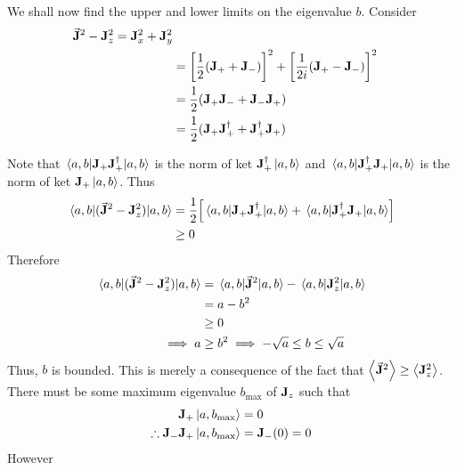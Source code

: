 \documentclass[12pt,a4paper,titlepage]{article}
\newcommand{\trm}[1]{\textrm{#1}} %
\begin{document}
We shall now find the upper and lower limits on the eigenvalue $b$. Consider
\begin{equation}
\begin{aligned}
\vec{\vb{J}}^{2}-\vb{J}_{z}^{2}=\vb{J}_{x}^{2}+\vb{J}_{y}^{2}\\
&=\qty[\frac{1}{2}\qty(\vb{J}_{+}+\vb{J}_{-})]^{2}+\qty[\frac{1}{2i}(\vb{J}_{+}-\vb{J}_{-})]^{2}\\
&=\frac{1}{2}(\vb{J}_{+}\vb{J}_{-}+\vb{J}_{-}\vb{J}_{+})\\
&=\frac{1}{2}(\vb{J}_{+}\vb{J}_{+}^{\dagger}+\vb{J}_{+}^{\dagger}\vb{J}_{+})
\end{aligned}
\end{equation}

Note that $\mel{a,b}{\vb{J}_{+}\vb{J}_{+}^{\dagger}}{a,b}$ is the norm of ket $\vb{J}_{+}^{\dagger}\ket{a,b}$ and $\mel{a,b}{\vb{J}_{+}^{\dagger}\vb{J}_{+}}{a,b}$ is the norm of ket $\vb{J}_{+}\ket{a,b}$. Thus
\begin{equation}
\begin{aligned}
\mel{a,b}{(\vec{\vb{J}}^{2}-\vb{J}_{z}^{2})}{a,b}&=\frac{1}{2}\qty[\mel{a,b}{\vb{J}_{+}\vb{J}_{+}^{\dagger}}{a,b}+\mel{a,b}{\vb{J}_{+}^{\dagger}\vb{J}_{+}}{a,b}]\\
&\geq 0
\end{aligned}
\end{equation}
Therefore
\begin{equation}
\begin{aligned}
\mel{a,b}{(\vec{\vb{J}}^{2}-\vb{J}_{z}^{2})}{a,b}&=\mel{a,b}{\vec{\vb{J}}^{2}}{a,b}-\mel{a,b}{\vb{J}_{z}^{2}}{a,b}\\
&=a-b^{2}\\
&\geq0\\
\implies a&\geq b^{2} \implies -\sqrt{a}\leq b \leq \sqrt{a}
\end{aligned}
\end{equation}
Thus, $b$ is bounded. This is merely a consequence of the fact that $\expval{\vec{\vb{J}}^{2}}\geq\expval{\vb{J}_{z}^{2}}$. There must be some maximum eigenvalue $b_{\trm{max}}$ of $\vb{J}_{z}$ such that
\begin{equation}
\begin{aligned}
\vb{J}_{+}\ket{a,b_{\trm{max}}}&=0\\
\therefore \vb{J}_{-}\vb{J}_{+}\ket{a,b_{\trm{max}}}&=\vb{J}_{-}(0)=0
\end{aligned}
\end{equation}
However
\end{document}
